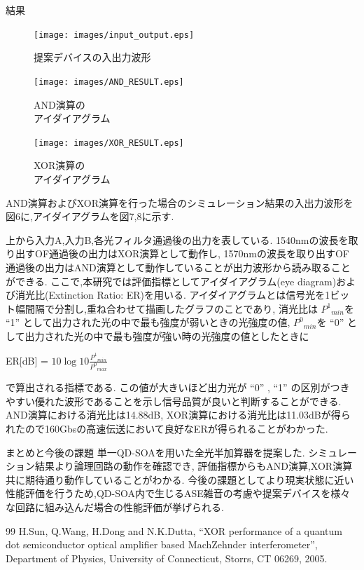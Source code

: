 \documentclass[dvipdfmx]{ujarticle}
\makeatletter
\def\section{\@startsection{section}{1}{\z@}
   {0.8\Cvs \@plus.5\Cdp \@minus.2\Cdp}
   {0.2\Cvs \@plus.3\Cdp}
   {\normalfont \Large \bfseries}}
\def\section{\@startsection{section}{1}{\z@}
   {0.8\Cvs \@plus.5\Cdp \@minus.2\Cdp}
   {0.2\Cvs \@plus.3\Cdp}
   {\normalfont \Large \bfseries}}
\makeatother
\begin{document}
\section{結果}
  \begin{figure}
    \centering
    \texttt{[image: images/input\_output.eps]}
    \caption{提案デバイスの入出力波形}
    \texttt{[image: images/AND\_RESULT.eps]}
    \caption{AND演算の\\アイダイアグラム}
    \texttt{[image: images/XOR\_RESULT.eps]}
    \caption{XOR演算の\\アイダイアグラム}
  \end{figure}
  AND演算およびXOR演算を行った場合のシミュレーション結果の入出力波形を図6に,アイダイアグラムを図7,8に示す.\par
  上から入力A,入力B,各光フィルタ通過後の出力を表している.
  1540nmの波長を取り出すOF通過後の出力はXOR演算として動作し,
  1570nmの波長を取り出すOF通過後の出力はAND演算として動作していることが出力波形から読み取ることができる.
  ここで,本研究では評価指標としてアイダイアグラム(eye diagram)および消光比(Extinction Ratio: ER)を用いる.
  アイダイアグラムとは信号光を1ビット幅間隔で分割し,重ね合わせて描画したグラフのことであり,
  消光比は ${P^1}_{min}$を “1” として出力された光の中で最も強度が弱いときの光強度の値,
  ${P^0}_{min}$を “0” として出力された光の中で最も強度が強い時の光強度の値としたときに\\
  \begin{center}
    ER[dB] = $10 \log{10}{\frac{{P^1}_{min}}{{P^0}_{max}}}$
  \end{center}
  で算出される指標である.
  この値が大きいほど出力光が “0” , “1” の区別がつきやすい優れた波形であることを示し信号品質が良いと判断することができる.
  AND演算における消光比は14.88dB, XOR演算における消光比は11.03dBが得られたので160Gbsの高速伝送において良好なERが得られることがわかった.
  
\section{まとめと今後の課題}
  単一QD-SOAを用いた全光半加算器を提案した.
  シミュレーション結果より論理回路の動作を確認でき, 評価指標からもAND演算,XOR演算共に期待通り動作していることがわかる.
  今後の課題としてより現実状態に近い性能評価を行うため,QD-SOA内で生じるASE雑音の考慮や提案デバイスを様々な回路に組み込んだ場合の性能評価が挙げられる.

\begin{thebibliography} {99}
   H.Sun, Q.Wang, H.Dong and N.K.Dutta, “XOR performance of a quantum dot semiconductor optical amplifier based MachZehnder interferometer”, Department of Physics, University of Connecticut, Storrs, CT 06269, 2005.
\end{thebibliography}
\end{document}
